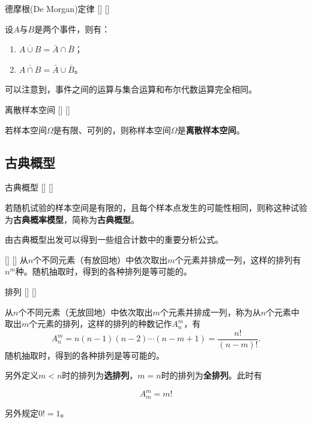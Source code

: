 \documentclass[UTF8]{ctexart}
\begin{document}
        \begin{thm}
            []
            {德摩根(De Morgan)定律}
            []
            []


            设$A$与$B$是两个事件，则有：

            \begin{enumerate}
                \item $\overline{A\cup B}=\bar{A}\cap\bar{B}$；
                \item $\overline{A\cap B}=\bar{A}\cup\bar{B}$。
            \end{enumerate}
        \end{thm}

        可以注意到，事件之间的运算与集合运算和布尔代数运算完全相同。

        \begin{dfn}
            []
            {离散样本空间}
            []
            []


            若样本空间$\Omega$是有限、可列的，则称样本空间$\Omega$是\textbf{离散样本空间}。
        \end{dfn}
    
    \subsection{古典概型}
    
        \begin{dfn}
            []
            {古典概型}
            []
            []


            若随机试验的样本空间是有限的，且每个样本点发生的可能性相同，则称这种试验为\textbf{古典概率模型}，简称为\textbf{古典概型}。
        \end{dfn}

        由古典概型出发可以得到一些组合计数中的重要分析公式。

        \begin{xmp}
            []
            {}
            []
            []
            从$n$个不同元素（有放回地）中依次取出$m$个元素并排成一列，这样的排列有$n^m$种。随机抽取时，得到的各种排列是等可能的。
        \end{xmp}

        \begin{xmp}
            []
            {排列}
            []
            []


            从$n$个不同元素（无放回地）中依次取出$m$个元素并排成一列，称为从$n$个元素中取出$m$个元素的排列，这样的排列的种数记作$A_n^m$，有\[A_n^m=n(n-1)(n-2)\cdots(n-m+1)=\frac{n!}{(n-m)!}.\]随机抽取时，得到的各种排列是等可能的。

            另外定义$m<n$时的排列为\textbf{选排列}，$m=n$时的排列为\textbf{全排列}。此时有

            \[A^{m}_{m}=m!\]

            另外规定$0!=1$。
        \end{xmp}
\end{document}
